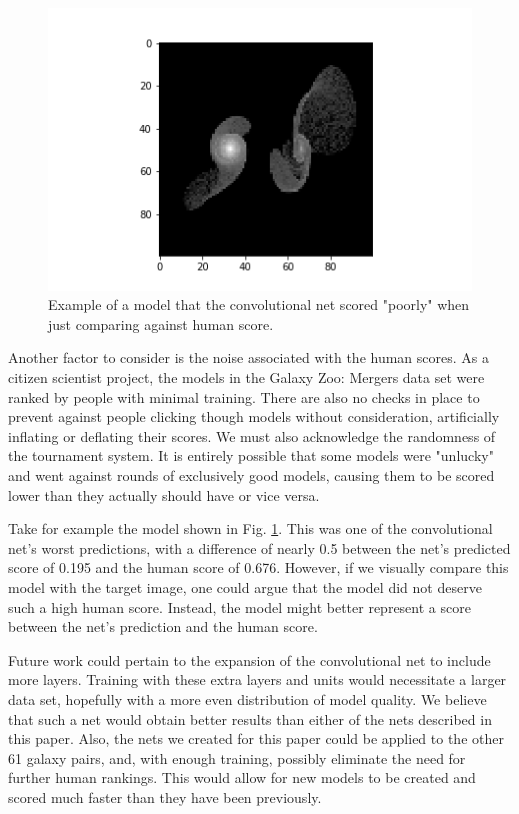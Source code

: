 \documentclass[conference]{IEEEtran}
\begin{document}
\begin{figure}[htbp]
\centerline{\includegraphics[width=0.75\linewidth]{./Images/ConvHumanNoiseExample.png}}
\caption{Example of a model that the convolutional net scored "poorly" when just comparing against human score.}
\label{fig:ConvHumanNoiseExample}
\end{figure}

Another factor to consider is the noise associated with the human scores. As a citizen scientist project, the models in the Galaxy Zoo: Mergers data set were ranked by people with minimal training. There are also no checks in place to prevent against people clicking though models without consideration, artificially inflating or deflating their scores. We must also acknowledge the randomness of the tournament system. It is entirely possible that some models were "unlucky" and went against rounds of exclusively good models, causing them to be scored lower than they actually should have or vice versa.

Take for example the model shown in Fig. \ref{fig:ConvHumanNoiseExample}. This was one of the convolutional net's worst predictions, with a difference of nearly 0.5 between the net's predicted score of 0.195 and the human score of 0.676. However, if we visually compare this model with the target image, one could argue that the model did not deserve such a high human score. Instead, the model might better represent a score between the net's prediction and the human score. 

Future work could pertain to the expansion of the convolutional net to include more layers. Training with these extra layers and units would necessitate a larger data set, hopefully with a more even distribution of model quality. We believe that such a net would obtain better results than either of the nets described in this paper.  Also, the nets we created for this paper could be applied to the other 61 galaxy pairs, and, with enough training, possibly eliminate the need for further human rankings. This would allow for new models to be created and scored much faster than they have been previously. 



\end{document}
